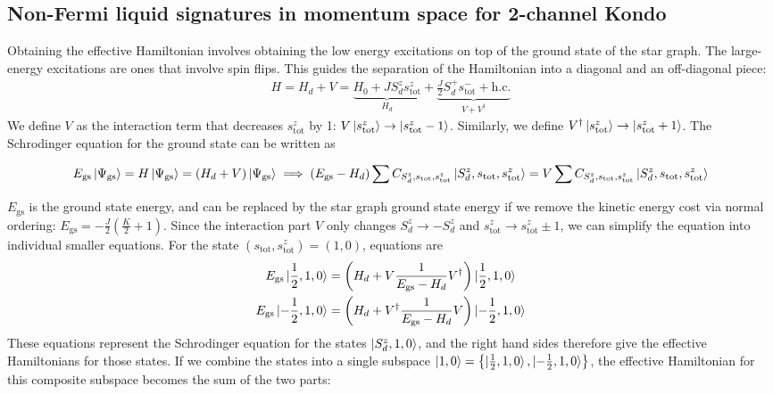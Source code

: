 \documentclass[reprint,prb,superscriptaddress]{revtex4-2}
\begin{document}
\subsection{Non-Fermi liquid signatures in momentum space for 2-channel Kondo}
Obtaining the effective Hamiltonian involves obtaining the low energy excitations on top of the ground state of the star graph. The large-energy excitations are ones that involve spin flips. This guides the separation of the Hamiltonian into a diagonal and an off-diagonal piece:
\begin{align}
	H = H_d + V = \underbrace{H_0 + J S_d^z s_\text{tot}^z}_{H_d} + \underbrace{\frac{J}{2}S_d^+ s_\text{tot}^- + \text{h.c.}}_{V + V^\dagger}
\end{align}
We define \(V\) as the interaction term that decreases \(s_\text{tot}^z\) by 1: \(V \ket{s_\text{tot}^z} \to \ket{s_\text{tot}^z - 1}\). Similarly, we define \(V^\dagger \ket{s_\text{tot}^z} \to \ket{s_\text{tot}^z + 1}\). The Schrodinger equation for the ground state can be written as
\begin{widetext}
\begin{align}
	E_\text{gs}\ket{\Psi_\text{gs}} = H \ket{\Psi_\text{gs}} = \left(H_d + V\right)\ket{\Psi_\text{gs}} \implies \left(E_\text{gs} - H_d\right)\sum C_{S_d^z, s_\text{tot},s_\text{tot}^z}\ket{S_d^z, s_\text{tot}, s_\text{tot}^z} = V\sum C_{S_d^z, s_\text{tot},s_\text{tot}^z}\ket{S_d^z, s_\text{tot}, s_\text{tot}^z}
\end{align}
\end{widetext}
\(E_\text{gs}\) is the ground state energy, and can be replaced by the star graph ground state energy if we remove the kinetic energy cost via normal ordering: \(E_\text{gs} = -\frac{J}{2}\left(\frac{K}{2}+1\right) \). Since the interaction part \(V\) only changes \(S_d^z \to -S_d^z\) and \(s^z_\text{tot} \to s^z_\text{tot} \pm 1\), we can simplify the equation into individual smaller equations. For the state \((s_\text{tot},s^z_\text{tot}) = (1,0)\), equations are
\begin{align}
	\label{eff_ham_Sdz_10}
	E_\text{gs} \ket{\frac{1}{2}, 1, 0} &= \left(H_d + V \frac{1}{E_\text{gs} - H_d}V^\dagger\right) \ket{\frac{1}{2}, 1, 0}\\
	E_\text{gs} \ket{-\frac{1}{2}, 1, 0} &= \left(H_d + V^\dagger \frac{1}{E_\text{gs} - H_d} V\right) \ket{-\frac{1}{2}, 1, 0}\\
\end{align}
These equations represent the Schrodinger equation for the states \(\ket{S_d^z, 1, 0}\), and the right hand sides therefore give the effective Hamiltonians for those states. If we combine the states into a single subspace \(\ket{1,0}= \left\{\ket{\frac{1}{2}, 1, 0}, \ket{-\frac{1}{2}, 1, 0}\right\}\), the effective Hamiltonian for this composite subspace becomes the sum of the two parts:
\end{document}
